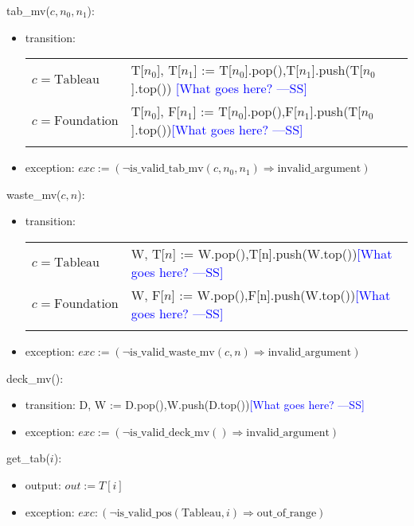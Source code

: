 \documentclass[12pt]{article}
\newcommand{\authornote}[3]{\textcolor{#1}{[#3 ---#2]}}
\newcommand{\authornote}[3]{}
\newcommand{\wss}[1]{\authornote{blue}{SS}{#1}}
\begin{document}
\noindent tab\_mv($c, n_0, n_1$):
\begin{itemize}
\item transition:

\begin{tabular}{|p{3cm}|l|}
\hhline{|-|-|}
$c = \mbox{Tableau}$ & T[$n_0$], T[$n_1$] := T[$n_0$].pop(),T[$n_1$].push(T[$n_0$].top()) \wss{What goes here?}\\
\hhline{|-|-|}
$c = \mbox{Foundation}$ & T[$n_0$], F[$n_1$] := T[$n_0$].pop(),F[$n_1$].push(T[$n_0$].top())\wss{What goes here?}\\
\hhline{|-|-|}
\end{tabular}

\item exception: $exc := (\neg \text{is\_valid\_tab\_mv}(c, n_0, n_1)
  \Rightarrow \text{invalid\_argument})$

\end{itemize}

\noindent waste\_mv($c, n$):
\begin{itemize}
\item transition:

\begin{tabular}{|p{3cm}|l|}
\hhline{|-|-|}
$c = \mbox{Tableau}$ & W, T[$n$] :=  W.pop(),T[n].push(W.top())\wss{What goes here?}\\
\hhline{|-|-|}
$c = \mbox{Foundation}$ & W, F[$n$] :=  W.pop(),F[n].push(W.top())\wss{What goes here?}\\
\hhline{|-|-|}
\end{tabular}

\item exception:
  $exc := (\neg \text{is\_valid\_waste\_mv}(c, n) \Rightarrow
  \text{invalid\_argument})$

\end{itemize}

\noindent deck\_mv():
\begin{itemize}
\item transition: D, W := D.pop(),W.push(D.top())\wss{What goes here?}
\item exception:
  $exc := (\neg \text{is\_valid\_deck\_mv}() \Rightarrow \text{invalid\_argument})$
\end{itemize}

\noindent get\_tab($i$):
\begin{itemize}
\item output: $out := T[i]$
\item exception: $exc : (\neg \text{is\_valid\_pos}(\text{Tableau}, i) \Rightarrow \text{out\_of\_range})$
\end{itemize}
\end{document}
